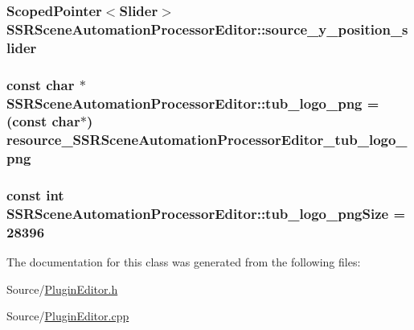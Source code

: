 \hypertarget{classSSRSceneAutomationProcessorEditor_a4dfea9893ab555673dc67b81a7721932}{
\subsubsection[{source\-\_\-y\-\_\-position\-\_\-slider}]{\setlength{\rightskip}{0pt plus 5cm}Scoped\-Pointer$<$Slider$>$ S\-S\-R\-Scene\-Automation\-Processor\-Editor\-::source\-\_\-y\-\_\-position\-\_\-slider\hspace{0.3cm}{\ttfamily [private]}}}\label{classSSRSceneAutomationProcessorEditor_a4dfea9893ab555673dc67b81a7721932}
\hypertarget{classSSRSceneAutomationProcessorEditor_ab6a8a9ff45ef50aa206d4702ad25f53c}{
\subsubsection[{tub\-\_\-logo\-\_\-png}]{\setlength{\rightskip}{0pt plus 5cm}const char $\ast$ S\-S\-R\-Scene\-Automation\-Processor\-Editor\-::tub\-\_\-logo\-\_\-png = (const char$\ast$) resource\-\_\-\-S\-S\-R\-Scene\-Automation\-Processor\-Editor\-\_\-tub\-\_\-logo\-\_\-png\hspace{0.3cm}{\ttfamily [static]}}}\label{classSSRSceneAutomationProcessorEditor_ab6a8a9ff45ef50aa206d4702ad25f53c}
\hypertarget{classSSRSceneAutomationProcessorEditor_ac5570c4666280cb9a09ffa8464f6a1e3}{
\subsubsection[{tub\-\_\-logo\-\_\-png\-Size}]{\setlength{\rightskip}{0pt plus 5cm}const int S\-S\-R\-Scene\-Automation\-Processor\-Editor\-::tub\-\_\-logo\-\_\-png\-Size = 28396\hspace{0.3cm}{\ttfamily [static]}}}\label{classSSRSceneAutomationProcessorEditor_ac5570c4666280cb9a09ffa8464f6a1e3}


The documentation for this class was generated from the following files\-:\begin{DoxyCompactItemize}
\item 
Source/\hyperlink{PluginEditor_8h}{Plugin\-Editor.\-h}\item 
Source/\hyperlink{PluginEditor_8cpp}{Plugin\-Editor.\-cpp}\end{DoxyCompactItemize}
